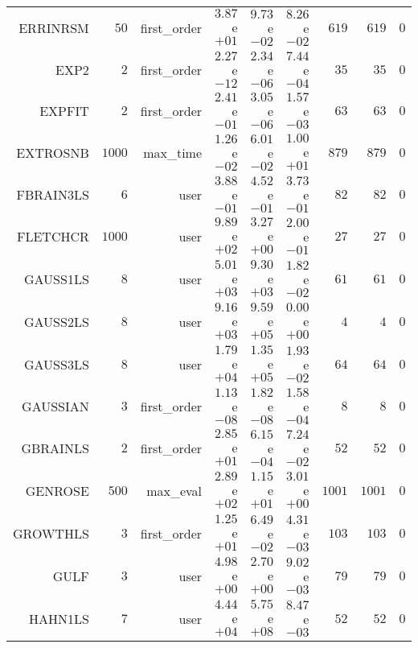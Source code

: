 \begin{longtable}{rrrrrrrrr}
ERRINRSM & \(    50\) & first\_order & \( 3.87\)e\(+01\) & \( 9.73\)e\(-02\) & \( 8.26\)e\(-02\) & \(   619\) & \(   619\) & \(     0\) \\
EXP2 & \(     2\) & first\_order & \( 2.27\)e\(-12\) & \( 2.34\)e\(-06\) & \( 7.44\)e\(-04\) & \(    35\) & \(    35\) & \(     0\) \\
EXPFIT & \(     2\) & first\_order & \( 2.41\)e\(-01\) & \( 3.05\)e\(-06\) & \( 1.57\)e\(-03\) & \(    63\) & \(    63\) & \(     0\) \\
EXTROSNB & \(  1000\) & max\_time & \( 1.26\)e\(-02\) & \( 6.01\)e\(-02\) & \( 1.00\)e\(+01\) & \(   879\) & \(   879\) & \(     0\) \\
FBRAIN3LS & \(     6\) & user & \( 3.88\)e\(-01\) & \( 4.52\)e\(-01\) & \( 3.73\)e\(-01\) & \(    82\) & \(    82\) & \(     0\) \\
FLETCHCR & \(  1000\) & user & \( 9.89\)e\(+02\) & \( 3.27\)e\(+00\) & \( 2.00\)e\(-01\) & \(    27\) & \(    27\) & \(     0\) \\
GAUSS1LS & \(     8\) & user & \( 5.01\)e\(+03\) & \( 9.30\)e\(+03\) & \( 1.82\)e\(-02\) & \(    61\) & \(    61\) & \(     0\) \\
GAUSS2LS & \(     8\) & user & \( 9.16\)e\(+03\) & \( 9.59\)e\(+05\) & \( 0.00\)e\(+00\) & \(     4\) & \(     4\) & \(     0\) \\
GAUSS3LS & \(     8\) & user & \( 1.79\)e\(+04\) & \( 1.35\)e\(+05\) & \( 1.93\)e\(-02\) & \(    64\) & \(    64\) & \(     0\) \\
GAUSSIAN & \(     3\) & first\_order & \( 1.13\)e\(-08\) & \( 1.82\)e\(-08\) & \( 1.58\)e\(-04\) & \(     8\) & \(     8\) & \(     0\) \\
GBRAINLS & \(     2\) & first\_order & \( 2.85\)e\(+01\) & \( 6.15\)e\(-04\) & \( 7.24\)e\(-02\) & \(    52\) & \(    52\) & \(     0\) \\
GENROSE & \(   500\) & max\_eval & \( 2.89\)e\(+02\) & \( 1.15\)e\(+01\) & \( 3.01\)e\(+00\) & \(  1001\) & \(  1001\) & \(     0\) \\
GROWTHLS & \(     3\) & first\_order & \( 1.25\)e\(+01\) & \( 6.49\)e\(-02\) & \( 4.31\)e\(-03\) & \(   103\) & \(   103\) & \(     0\) \\
GULF & \(     3\) & user & \( 4.98\)e\(+00\) & \( 2.70\)e\(+00\) & \( 9.02\)e\(-03\) & \(    79\) & \(    79\) & \(     0\) \\
HAHN1LS & \(     7\) & user & \( 4.44\)e\(+04\) & \( 5.75\)e\(+08\) & \( 8.47\)e\(-03\) & \(    52\) & \(    52\) & \(     0\) \\

\end{longtable}
